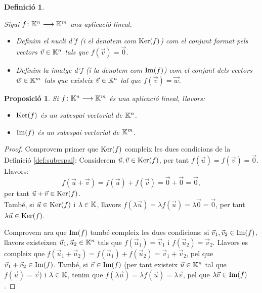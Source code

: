 \documentclass[
  11pt,
]{book}
\numberwithin{dummy}{section}
\theoremstyle{maincolornumbox}
\theoremstyle{blacknumex}
\theoremstyle{blacknumbox}
\newtheorem{definitionT}{Definició}[chapter]
\theoremstyle{maincolornum}
\newtheorem{propositionT}{Proposició}[chapter]
\newenvironment{proposition}{\begin{pBox}\begin{propositionT}}{\end{propositionT}\end{pBox}}
\newenvironment{definition}{\begin{dBox}\begin{definitionT}}{\end{definitionT}\end{dBox}}
\newlength\esp
\begin{document}
\begin{definition}
\protect\hypertarget{def:nucliimatge}{}\label{def:nucliimatge}

Sigui
\(f\colon \mathbb{K}^n \longrightarrow \mathbb{K}^m\) una aplicació lineal.

\begin{itemize}
\item
  Definim el \emph{nucli d'\(f\)} (i el denotem com \(\operatorname{Ker}(f)\)) com el conjunt
  format pels vectors \(\vec v\in \mathbb{K}^n\) tals que \(f(\vec v)=\vec 0\).
\item
  Definim la \emph{imatge d'\(f\)} (i la denotem com \(\operatorname{Im}(f)\)) com el
  conjunt dels vectors \(\vec w\in\mathbb{K}^m\) tals que existeix
  \(\vec v\in \mathbb{K}^n\) tal que \(f(\vec v)=\vec w\).
\end{itemize}

\end{definition}

\begin{proposition}

Si \(f \colon \mathbb{K}^n \longrightarrow \mathbb{K}^m\) és una aplicació lineal, llavors:

\begin{itemize}
\item
  \(\operatorname{Ker}(f)\) és un subespai vectorial de \(\mathbb{K}^n\).
\item
  \(\operatorname{Im}(f)\) és un subespai vectorial de \(\mathbb{K}^m\).
\end{itemize}

\end{proposition}

\begin{proof}
Comprovem primer que \(\operatorname{Ker}(f)\) compleix les dues condicions de
la Definició \ref{def:subespai}: Considerem \(\vec u, \vec v \in \operatorname{Ker}(f)\), per
tant \(f(\vec u)=f(\vec v)=\vec 0\). Llavors:
\[f(\vec u+\vec v)=f(\vec u)+f(\vec v)=\vec 0+\vec 0 =\vec 0 ,\] per
tant \(\vec u+\vec v \in \operatorname{Ker}(f)\).\\
També, si \(\vec u \in \operatorname{Ker}(f)\) i \(\lambda\in\mathbb{K}\), llavors
\(f(\lambda \vec u)=\lambda f(\vec u)=\lambda \vec 0=\vec 0\), per tant
\(\lambda \vec u\in\operatorname{Ker}(f)\).

Comprovem ara que \(\operatorname{Im}(f)\) també compleix les dues condicions: si
\(\vec v_1,\vec v_2 \in\operatorname{Im}(f)\), llavors existeixen
\(\vec u_1, \vec u_2 \in \mathbb{K}^n\) tals que \(f(\vec u_1)=\vec v_1\) i
\(f(\vec u_2)=\vec v_2\). Llavors es compleix que
\(f(\vec u_1+\vec u_2)=f(\vec u_1)+f(\vec u_2)=\vec v_1+\vec v_2\), pel
que \(\vec v_1+\vec v_2 \in \operatorname{Im}(f)\). També, si \(\vec v\in \operatorname{Im}(f)\) (per
tant existeix \(\vec u\in \mathbb{K}^n\) tal que \(f(\vec u)=\vec v\)) i
\(\lambda\in\mathbb{K}\), tenim que
\(f(\lambda \vec u)=\lambda f(\vec u)=\lambda \vec v\), pel que
\(\lambda \vec v \in \operatorname{Im}(f)\).
\end{proof}
\end{document}
